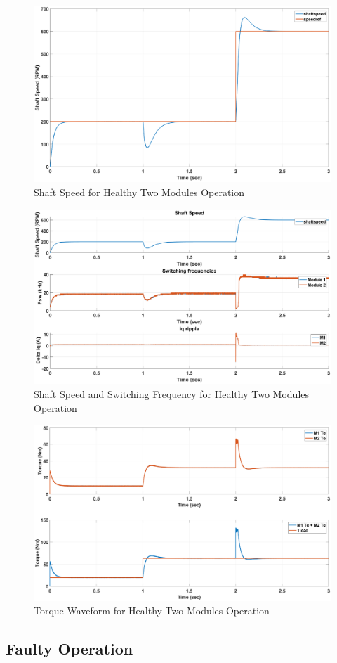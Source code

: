 \documentclass{article}
\begin{document}
\begin{figure}[h!]
\centering
\includegraphics[scale=0.35]{SimulationResults/two_modules/healthy/speed.eps}
\caption{Shaft Speed for Healthy Two Modules Operation}
\label{fig:ShaftSpeedTwoModulesHealthy}
\end{figure}

\begin{figure}[h!]
\centering
\includegraphics[scale=0.35]{SimulationResults/two_modules/healthy/speed_fsw_iqripple.eps}
\caption{Shaft Speed and Switching Frequency for Healthy Two Modules Operation}
\label{fig:ShaftSpeedFswIqRippleTwoModulesHealthy}
\end{figure}

\begin{figure}[h!]
\centering
\includegraphics[scale=0.35]{SimulationResults/two_modules/healthy/tref_tload.eps}
\caption{Torque Waveform for Healthy Two Modules Operation}
\label{fig:TorqueTwoModulesHealthy}
\end{figure}


\subsection{Faulty Operation}




\end{document}
